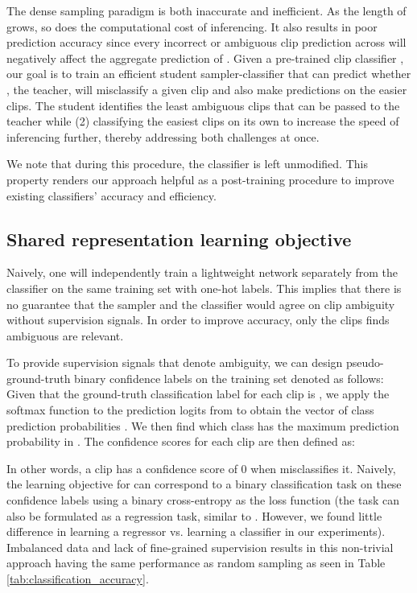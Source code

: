 \documentclass[a4paper,conference]{IEEEtran}
\begin{document}
The dense sampling paradigm is both inaccurate and inefficient. As the length of  grows, so does the computational cost of inferencing. It also results in poor prediction accuracy since every incorrect or ambiguous clip prediction across   will negatively affect the aggregate prediction of . Given a pre-trained clip classifier , our goal is to train an efficient student sampler-classifier  that can predict whether , the teacher, will misclassify a given clip  and also make predictions on the easier clips. The student identifies the least ambiguous clips that can be passed to the teacher while (2) classifying the easiest clips on its own to increase the speed of inferencing further, thereby addressing both challenges at once. 

We note that during this procedure, the classifier  is left unmodified. This property renders our approach helpful as a post-training procedure to improve existing classifiers' accuracy and efficiency.

\subsection{Shared representation learning objective}
\label{motivation}

Naively, one will independently train a lightweight network  separately from the classifier  on the same training set  with one-hot labels. This implies that there is no guarantee that the sampler and the classifier would agree on clip ambiguity without supervision signals. In order to improve accuracy, only the clips  finds ambiguous are relevant. 

To provide supervision signals that denote ambiguity, we can design pseudo-ground-truth binary confidence labels on the training set  denoted   as follows: Given that the ground-truth classification label for each clip  is , we apply the softmax function to the prediction logits from  to obtain the vector of class prediction probabilities . We then find which class  has the maximum prediction probability  in . The confidence scores  for each clip  are then defined as:



In other words, a clip has a confidence score of 0 when  misclassifies it. Naively, the learning objective for  can correspond to a binary classification task on these confidence labels using a binary cross-entropy as the loss function (the task can also be formulated as a regression task, similar to \cite{korbar2019scsampler}. However, we found little difference in learning a regressor vs. learning a classifier in our experiments). Imbalanced data and lack of fine-grained supervision results in this non-trivial approach having the same performance as random sampling as seen in Table \ref{tab:classification_accuracy}.
\end{document}
